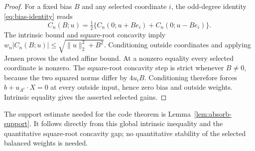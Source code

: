 \begin{proof}
For a fixed bias $B$ and any selected coordinate $i$, the odd-degree
identity \eqref{eq:bias-identity} reads
\[
 C_n(B;u)=\tfrac12\{C_n(0;u+Be_i)+C_n(0;u-Be_i)\}.
\]
The intrinsic bound and square-root concavity imply
$w_n|C_n(B;u)|\le\sqrt{\|u\|_2^2+B^2}$.
Conditioning outside coordinates and applying Jensen proves the stated
affine bound. At a nonzero equality every selected coordinate is
nonzero. The square-root concavity step is strict whenever $B\ne0$,
because the two squared norms differ by $4u_iB$. Conditioning therefore
forces $b+u_{A^c}\cdot X=0$ at every outside input, hence zero bias and
outside weights. Intrinsic equality gives the asserted selected gains.
\end{proof}

The support estimate needed for the code theorem is
Lemma~\ref{lem:absorb-support}. It follows directly from this global
intrinsic inequality and the quantitative square-root concavity gap;
no quantitative stability of the selected balanced weights is needed.
